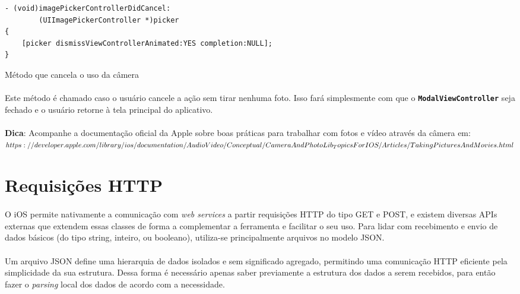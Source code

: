 \documentclass[a4paper,12pt,brazil,doubleside]{book}
\begin{document}
\begin{singlespace}
\begin{listing}[H]
\begin{verbatim}
- (void)imagePickerControllerDidCancel:
        (UIImagePickerController *)picker
{
    [picker dismissViewControllerAnimated:YES completion:NULL];
}
\end{verbatim}
\caption{Método que cancela o uso da câmera}
\end{listing}

\paragraph{}Este método é chamado caso o usuário cancele a ação sem tirar nenhuma foto. Isso fará simplesmente com que o \texttt{\textbf{ModalViewController}} seja fechado e o usuário retorne à tela principal do aplicativo.

\bigskip

\begin{framed}
\paragraph{}\textbf{Dica}: Acompanhe a documentação oficial da Apple sobre boas práticas para trabalhar com fotos e vídeo através da câmera em:\\
\(https://developer.apple.com/library/ios/documentation/AudioVideo/Conceptual/\\CameraAndPhotoLib_TopicsForIOS/Articles/TakingPicturesAndMovies.html\)
\end{framed}


\section{Requisições HTTP}

\paragraph{}O iOS permite nativamente a comunicação com \emph{web services} a partir requisições HTTP do tipo GET e POST, e existem diversas APIs externas que extendem essas classes de forma a complementar a ferramenta e facilitar o seu uso. Para lidar com recebimento e envio de dados básicos (do tipo string, inteiro, ou booleano), utiliza-se principalmente arquivos no modelo JSON.
\paragraph{}Um arquivo JSON define uma hierarquia de dados isolados e sem significado agregado, permitindo uma comunicação HTTP eficiente pela simplicidade da sua estrutura. Dessa forma é necessário apenas saber previamente a estrutura dos dados a serem recebidos, para então fazer o \emph{parsing} local dos dados de acordo com a necessidade.


\end{singlespace}
\end{document}
